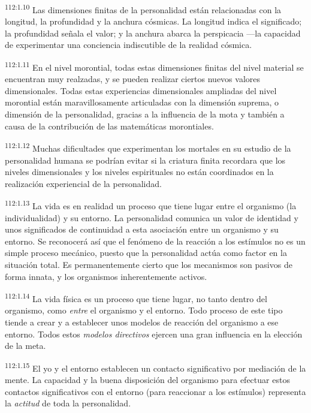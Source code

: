 \documentclass[twoside, 11pt]{book}
\begin{document}
\par
\textsuperscript{112:1.10} Las dimensiones finitas de la personalidad están relacionadas con la longitud, la profundidad y la anchura cósmicas. La longitud indica el significado; la profundidad señala el valor; y la anchura abarca la perspicacia ---la capacidad de experimentar una conciencia indiscutible de la realidad cósmica.

\par
\textsuperscript{112:1.11} En el nivel morontial, todas estas dimensiones finitas del nivel material se encuentran muy realzadas, y se pueden realizar ciertos nuevos valores dimensionales. Todas estas experiencias dimensionales ampliadas del nivel morontial están maravillosamente articuladas con la dimensión suprema, o dimensión de la personalidad, gracias a la influencia de la mota y también a causa de la contribución de las matemáticas morontiales.

\par
\textsuperscript{112:1.12} Muchas dificultades que experimentan los mortales en su estudio de la personalidad humana se podrían evitar si la criatura finita recordara que los niveles dimensionales y los niveles espirituales no están coordinados en la realización experiencial de la personalidad.

\par
\textsuperscript{112:1.13} La vida es en realidad un proceso que tiene lugar entre el organismo (la individualidad) y su entorno. La personalidad comunica un valor de identidad y unos significados de continuidad a esta asociación entre un organismo y su entorno. Se reconocerá así que el fenómeno de la reacción a los estímulos no es un simple proceso mecánico, puesto que la personalidad actúa como factor en la situación total. Es permanentemente cierto que los mecanismos son pasivos de forma innata, y los organismos inherentemente activos.

\par
\textsuperscript{112:1.14} La vida física es un proceso que tiene lugar, no tanto dentro del organismo, como \textit{entre} el organismo y el entorno. Todo proceso de este tipo tiende a crear y a establecer unos modelos de reacción del organismo a ese entorno. Todos estos \textit{modelos directivos} ejercen una gran influencia en la elección de la meta.

\par
\textsuperscript{112:1.15} El yo y el entorno establecen un contacto significativo por mediación de la mente. La capacidad y la buena disposición del organismo para efectuar estos contactos significativos con el entorno (para reaccionar a los estímulos) representa la \textit{actitud} de toda la personalidad.
\end{document}
